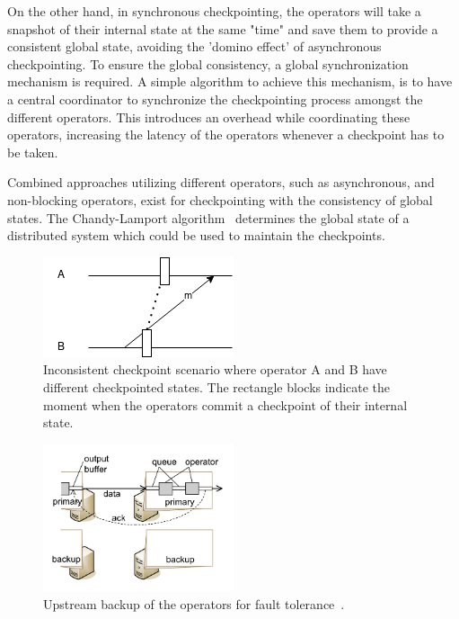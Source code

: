 On the other hand, in synchronous checkpointing, the operators will take a snapshot 
of their internal state at the same "time" and save them to provide a consistent 
global state, avoiding the 'domino effect' of asynchronous checkpointing. To ensure 
the global consistency, a global synchronization mechanism is required. A simple 
algorithm to achieve this mechanism, is to have a central coordinator to synchronize 
the checkpointing process amongst the different operators. This introduces an overhead 
while coordinating these operators, increasing the latency of the operators whenever a 
checkpoint has to be taken. 


Combined approaches utilizing different operators, such as asynchronous, and non-blocking
operators, exist for checkpointing with the consistency of global states. 
The Chandy-Lamport algorithm~\cite{chandy_lamport} determines the 
global state of a distributed system which could be used to maintain the checkpoints. 

\begin{figure}[!htbp]
    \centering
    \includegraphics{fig/checkpoint_inconsistency.png}
    \caption{Inconsistent checkpoint scenario where operator A and B have different
    checkpointed states. The rectangle blocks indicate the moment when the operators 
    commit a checkpoint of their internal state. }
    \label{fig:checkpoint_inconsistency}
\end{figure}


\begin{figure}[!htbp]
    \centering
    \includegraphics[width=0.5\textwidth]{fig/upstream.png}
    \caption{Upstream backup of the operators for fault tolerance~\cite{upstream_backup}.}
    \label{fig:upstream}
    
\end{figure}

